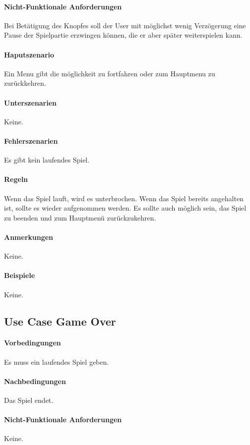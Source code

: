 \documentclass[a4paper, twosided, 11pt]{scrartcl}
\begin{document}
\paragraph{Nicht-Funktionale Anforderungen} Bei Betätigung des Knopfes soll der
User mit möglichst wenig Verzögerung eine Pause der Spielpartie erzwingen
können, die er aber später weiterspielen kann.

\paragraph{Haputszenario} Ein Menu gibt die m\"oglichkeit zu fortfahren oder
zum Hauptmenu zu zur\"uckkehren.

\paragraph{Unterszenarien} Keine.

\paragraph{Fehlerszenarien} Es gibt kein laufendes Spiel.
\paragraph{Regeln}
Wenn das Spiel lauft, wird es unterbrochen. Wenn das Spiel bereits angehalten
ist, sollte es wieder aufgenommen werden. Es sollte auch möglich sein, das
Spiel zu beenden und zum Hauptmenü zurückzukehren.
\paragraph{Anmerkungen} Keine.
\paragraph{Beispiele} Keine.

\subsection{Use Case Game Over}
\paragraph{Vorbedingungen} Es muss ein laufendes Spiel geben.
\paragraph{Nachbedingungen} Das Spiel endet.
\paragraph{Nicht-Funktionale Anforderungen} Keine.
\end{document}
